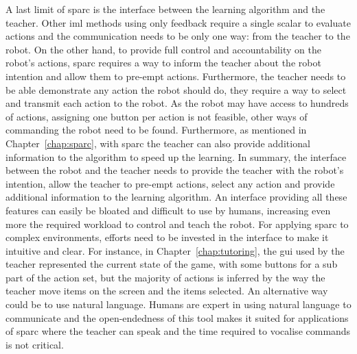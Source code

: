 A last limit of \gls{sparc} is the interface between the learning algorithm and the teacher. Other \gls{iml} methods using only feedback require a single scalar to evaluate actions and the communication needs to be only one way: from the teacher to the robot. On the other hand, to provide full control and accountability on the robot's actions, \gls{sparc} requires a way to inform the teacher about the robot intention and allow them to pre-empt actions. Furthermore, the teacher needs to be able demonstrate any action the robot should do, they require a way to select and transmit each action to the robot. As the robot may have access to hundreds of actions, assigning one button per action is not feasible, other ways of commanding the robot need to be found. Furthermore, as mentioned in Chapter~\ref{chap:sparc}, with \gls{sparc} the teacher can also provide additional information to the algorithm to speed up the learning. In summary, the interface between the robot and the teacher needs to provide the teacher with the robot's intention, allow the teacher to pre-empt actions, select any action and provide additional information to the learning algorithm. An interface providing all these features can easily be bloated and difficult to use by humans, increasing even more the required workload to control and teach the robot. For applying \gls{sparc} to complex environments, efforts need to be invested in the interface to make it intuitive and clear. For instance, in Chapter~\ref{chap:tutoring}, the \gls{gui} used by the teacher represented the current state of the game, with some buttons for a sub part of the action set, but the majority of actions is inferred by the way the teacher move items on the screen and the items selected. An alternative way could be to use natural language. Humans are expert in using natural language to communicate and the open-endedness of this tool makes it suited for applications of \gls{sparc} where the teacher can speak and the time required to vocalise commands is not critical.


